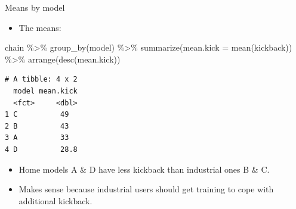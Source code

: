 \documentclass[
  ignorenonframetext,
]{beamer}
\newenvironment{Shaded}{\begin{snugshade}}{\end{snugshade}}
\newcommand{\AttributeTok}[1]{\textcolor[rgb]{0.40,0.45,0.13}{#1}}
\newcommand{\FunctionTok}[1]{\textcolor[rgb]{0.28,0.35,0.67}{#1}}
\newcommand{\NormalTok}[1]{\textcolor[rgb]{0.00,0.23,0.31}{#1}}
\newcommand{\SpecialCharTok}[1]{\textcolor[rgb]{0.37,0.37,0.37}{#1}}
\providecommand{\tightlist}{%
  \setlength{\itemsep}{0pt}\setlength{\parskip}{0pt}}\usepackage{longtable,booktabs,array}
\begin{document}
\begin{frame}[fragile]{Means by model}
\protect\hypertarget{means-by-model}{}
\begin{itemize}
\tightlist
\item
  The means:
\end{itemize}

\footnotesize

\begin{Shaded}
\begin{Highlighting}[]
\NormalTok{chain }\SpecialCharTok{\%\textgreater{}\%}
  \FunctionTok{group\_by}\NormalTok{(model) }\SpecialCharTok{\%\textgreater{}\%}
  \FunctionTok{summarize}\NormalTok{(}\AttributeTok{mean.kick =} \FunctionTok{mean}\NormalTok{(kickback)) }\SpecialCharTok{\%\textgreater{}\%}
  \FunctionTok{arrange}\NormalTok{(}\FunctionTok{desc}\NormalTok{(mean.kick))}
\end{Highlighting}
\end{Shaded}

\begin{verbatim}
# A tibble: 4 x 2
  model mean.kick
  <fct>     <dbl>
1 C          49  
2 B          43  
3 A          33  
4 D          28.8
\end{verbatim}

\small

\begin{itemize}
\item
  Home models A \& D have less kickback than industrial ones B \& C.
\item
  Makes sense because industrial users should get training to cope with
  additional kickback.
\end{itemize}

\normalsize
\end{frame}
\end{document}
